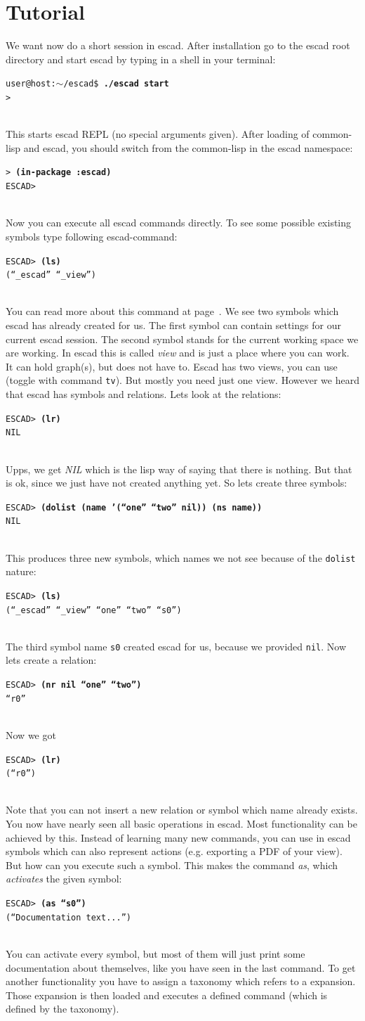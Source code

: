 \documentclass[a4paper, 12pt, openany]{scrbook}
\makeatletter
\newcommand{\shellcmdline}[2]{\\
  \setlength{\fboxsep}{2pt}\colorbox{black!20}{\parbox{\textwidth}{\texttt{user@host:$\sim$/escad\$ \textbf{#1}\\#2}}}\\}
\newcommand{\escadcmdline}[2]{\\\setlength{\fboxsep}{2pt}\colorbox{black!20}{\parbox{\textwidth}{\texttt{ESCAD> \textbf{#1}\\#2}}}\\}
\newcommand{\lispcmdline}[2]{\\\setlength{\fboxsep}{2pt}\colorbox{black!20}{\parbox{\textwidth}{\texttt{> \textbf{#1}\\#2}}}\\}
\makeatother
\begin{document}
\section{Tutorial}
We want now do a short session in escad. After installation go to the escad root directory and start escad by typing in a shell in your terminal:
\shellcmdline{./escad start}{>}
This starts escad REPL (no special arguments given). After loading of common-lisp and escad, you should switch from the common-lisp in the escad namespace:
\lispcmdline{(in-package :escad)}{ESCAD>}
Now you can execute all escad commands directly. To see some possible existing symbols type following escad-command:
\escadcmdline{(ls)}{(``\_escad'' ``\_view'')}\label{ex:ls}
You can read more about this command at page~\pageref{it:ls}. We see two symbols which escad has already created for us. The first symbol can contain settings for our current escad session. The second symbol stands for the current working space we are working. In escad this is called \emph{view} and is just a place where you can work. It can hold graph(s), but does not have to. Escad has two views, you can use (toggle with command \texttt{tv}). But mostly you need just one view.
However we heard that escad has symbols and relations. Lets look at the relations:
\escadcmdline{(lr)}{NIL}\label{ex:lr}
Upps, we get \emph{NIL} which is the lisp way of saying that there is nothing. But that is ok, since we just have not created anything yet. So lets create three symbols:
\escadcmdline{(dolist (name '(``one'' ``two'' nil)) (ns name))}{NIL}\label{ex:ns}
This produces three new symbols, which names we not see because of the \texttt{dolist} nature:
\escadcmdline{(ls)}{(``\_escad'' ``\_view'' ``one'' ``two'' ``s0'')}
The third symbol name \texttt{s0} created escad for us, because we provided \texttt{nil}.
Now lets create a relation:
\escadcmdline{(nr nil ``one'' ``two'')}{``r0''}\label{ex:nr}
Now we got
\escadcmdline{(lr)}{(``r0'')}
Note that you can not insert a new relation or symbol which name already exists.
You now have nearly seen all basic operations in escad. Most functionality can be achieved by this. Instead of learning many new commands, you can use in escad symbols which can also represent actions (e.g. exporting a PDF of your view). But how can you execute such a symbol. This makes the command \emph{as}, which \emph{activates} the given symbol:
\escadcmdline{(as ``s0'')}{(``Documentation text...'')}
You can activate every symbol, but most of them will just print some documentation about themselves, like you have seen in the last command. To get another functionality you have to assign a taxonomy which refers to a expansion. Those expansion is then loaded and executes a defined command (which is defined by the taxonomy).
\end{document}
